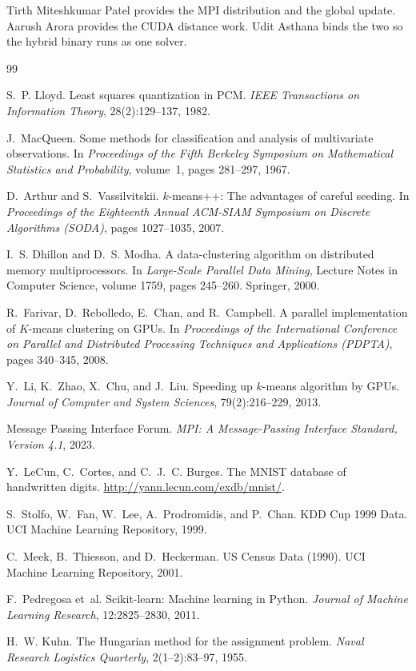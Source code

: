 \documentclass[12pt,a4paper]{article}
\begin{document}
Tirth Miteshkumar Patel provides the MPI distribution and the global update. Aarush Arora provides the CUDA distance work. Udit Asthana binds the two so the hybrid binary runs as one solver.

\begin{thebibliography}{99}

S.~P. Lloyd.
\newblock Least squares quantization in PCM.
\newblock \emph{IEEE Transactions on Information Theory}, 28(2):129--137, 1982.

J.~MacQueen.
\newblock Some methods for classification and analysis of multivariate observations.
\newblock In \emph{Proceedings of the Fifth Berkeley Symposium on Mathematical Statistics and Probability}, volume~1, pages 281--297, 1967.

D.~Arthur and S.~Vassilvitskii.
\newblock $k$-means++: The advantages of careful seeding.
\newblock In \emph{Proceedings of the Eighteenth Annual ACM-SIAM Symposium on Discrete Algorithms (SODA)}, pages 1027--1035, 2007.

I.~S. Dhillon and D.~S. Modha.
\newblock A data-clustering algorithm on distributed memory multiprocessors.
\newblock In \emph{Large-Scale Parallel Data Mining}, Lecture Notes in Computer Science, volume 1759, pages 245--260. Springer, 2000.

R.~Farivar, D.~Rebolledo, E.~Chan, and R.~Campbell.
\newblock A parallel implementation of $K$-means clustering on GPUs.
\newblock In \emph{Proceedings of the International Conference on Parallel and Distributed Processing Techniques and Applications (PDPTA)}, pages 340--345, 2008.

Y.~Li, K.~Zhao, X.~Chu, and J.~Liu.
\newblock Speeding up $k$-means algorithm by GPUs.
\newblock \emph{Journal of Computer and System Sciences}, 79(2):216--229, 2013.

Message Passing Interface Forum.
\newblock \emph{MPI: A Message-Passing Interface Standard, Version 4.1}, 2023.

Y.~LeCun, C.~Cortes, and C.~J.~C. Burges.
\newblock The MNIST database of handwritten digits.
\newblock \url{http://yann.lecun.com/exdb/mnist/}.

S.~Stolfo, W.~Fan, W.~Lee, A.~Prodromidis, and P.~Chan.
\newblock KDD Cup 1999 Data.
\newblock UCI Machine Learning Repository, 1999.

C.~Meek, B.~Thiesson, and D.~Heckerman.
\newblock US Census Data (1990).
\newblock UCI Machine Learning Repository, 2001.

F.~Pedregosa et~al.
\newblock Scikit-learn: Machine learning in Python.
\newblock \emph{Journal of Machine Learning Research}, 12:2825--2830, 2011.

H.~W. Kuhn.
\newblock The Hungarian method for the assignment problem.
\newblock \emph{Naval Research Logistics Quarterly}, 2(1--2):83--97, 1955.

\end{thebibliography}
\end{document}
